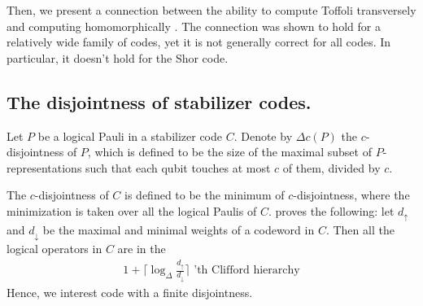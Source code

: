 Then, we present a connection between the ability to compute Toffoli transversely and computing homomorphically \cite{newman2017limitationstransversalcomputationquantum}. The connection was shown to hold for a relatively wide family of codes, yet it is not generally correct for all codes. In particular, it doesn't hold for the Shor code.
  \subsection{The disjointness of stabilizer codes.} 

   
\newcommand{\Disc}{ \frac{ \frac{1}{2} \Delta^{2} }{\frac{1}{2} \Delta^{2} - 1  } } 

\begin{definition}
Let $P$ be a logical Pauli in a stabilizer code $C$. Denote by $\Delta{c}(P)$ the $c$-disjointness of $P$, which is defined to be the size of the maximal subset of $P$-representations such that each qubit touches at most $c$ of them, divided by $c$. 


The $c$-disjointness of $C$ is defined to be the minimum of $c$-disjointness, where the minimization is taken over all the logical Paulis of $C$. \cite{Jochym_O_Connor_2018} proves the following: let $d_{\uparrow}$ and $d_{\downarrow}$ be the maximal and minimal weights of a codeword in $C$. Then all the logical operators in $C$ are in the   
\begin{equation*}
  \begin{split}
    1 + \lceil \log_{\Delta}\frac{d_{\uparrow} }{d_{\downarrow} } \rceil \text{   'th Clifford hierarchy}
  \end{split}
\end{equation*}
Hence, we interest code with a finite disjointness.  

\end{definition}

